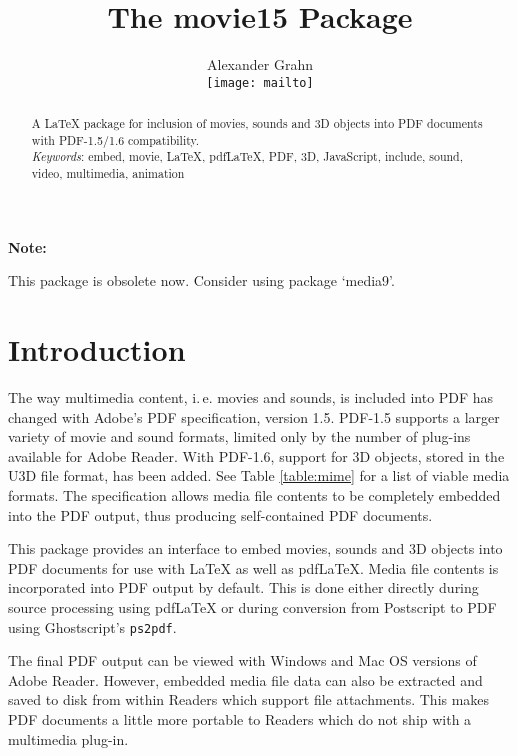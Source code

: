 \documentclass[a4paper]{article}
\begin{document}
\title{The {\sffamily movie15} Package}
\author{Alexander Grahn\\[1ex]\texttt{[image: mailto]}}
\maketitle

\begin{abstract}\noindent
A \LaTeX{} package for inclusion of movies, sounds and 3D objects into PDF documents with PDF-1.5/1.6 compatibility.\\[0.2\baselineskip]
\emph{Keywords}: embed, movie, LaTeX, pdfLaTeX, PDF, 3D, JavaScript, \mbox{include}, sound, video, multimedia, animation
\end{abstract}

\begin{animateinline}{1.5}\strut{\bf\color{red} Note:}\newframe\newframe[5]\end{animateinline} This package is obsolete now. Consider using package `media9'. 
\tableofcontents

\section{Introduction}

The way multimedia content, i.\,e. movies and sounds, is included into PDF has changed with Adobe's PDF specification, version 1.5. PDF-1.5 supports a larger variety of movie and sound formats, limited only by the number of plug-ins available for Adobe Reader\textsuperscript{\scriptsize\textregistered}. With PDF-1.6, support for 3D objects, stored in the U3D file format, has been added. See Table \ref{table:mime} for a list of viable media formats. The specification allows media file contents to be completely embedded into the PDF output, thus producing self-contained PDF documents.

This package provides an interface to embed movies, sounds and 3D objects into PDF documents for use with \LaTeX{} as well as pdf\LaTeX. Media file contents is incorporated into PDF output by default. This is done either directly during source processing using pdf\LaTeX{} or during conversion from Postscript to PDF using Ghostscript's \verb+ps2pdf+.

The final PDF output can be viewed with Windows\textsuperscript{\scriptsize\textregistered} and Mac OS\textsuperscript{\scriptsize\textregistered} versions of Adobe Reader. However, embedded media file data can also be extracted and saved to disk from within Readers which support file attachments. This makes PDF documents a little more portable to Readers which do not ship with a multimedia plug-in.
\end{document}
